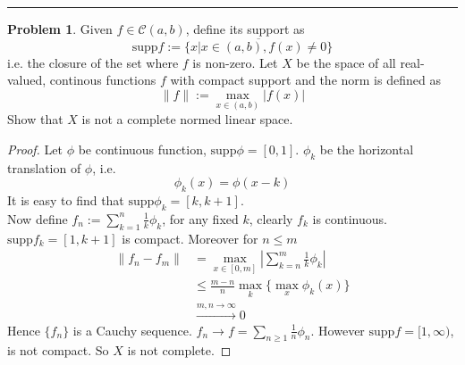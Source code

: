 \documentclass[a4paper, 10pt]{article}
\theoremstyle{definition}
\newtheorem{problem}{Problem}
\theoremstyle{hSol}
\begin{document}
\noindent\rule{16cm}{0.4pt}
\begin{problem} Given $f\in \mathcal{C}(a,b)$, define its support as
$$\text{supp}f:=\overline{\{x|x\in(a,b), f(x)\ne 0\}}$$
i.e. the closure of the set where $f$ is non-zero. Let $X$ be the space of all real-valued, continous functions $f$ with compact support and the norm is defined as
$$\|f\|:= \max\limits_{x\in (a,b)}|f(x)|$$
Show that $X$ is not a complete normed linear space.
\end{problem}
\begin{proof} Let $\phi$ be continuous function, $\text{supp}\phi = [0,1]$. $\phi_k$ be the horizontal translation of $\phi$, i.e. 
$$\phi_k(x)=\phi(x-k)$$
It is easy to find that $\text{supp}\phi_k = [k,k+1]$.  \\
Now define $f_n:=\sum_{k=1}^n \frac{1}{k}\phi_k$, for any fixed $k$, clearly $f_k$ is continuous. $\text{supp}f_k=[1,k+1]$ is compact. Moreover for $n\leq m$
\begin{equation}
	\begin{split}
		\|f_n - f_m\| &= \max\limits_{x\in [0,m]} \left|\sum_{k=n}^m \frac{1}{k}\phi_k\right| \\
		&\leq \frac{m-n}{n} \max\limits_{k}\{\max\limits_{x}\phi_k(x)\} \\
		&\xrightarrow{m,n\to \infty} 0
	\end{split}
\end{equation}
Hence $\{f_n\}$ is a Cauchy sequence. $f_n \to f = \sum_{n\geq 1}\frac{1}{n}\phi_n$. However $\text{supp}f=[1, \infty)$, is not compact. So $X$ is not complete.
\end{proof}
\end{document}
